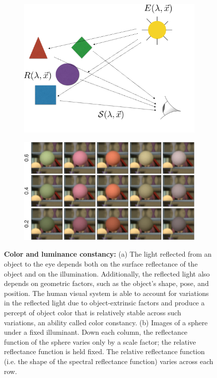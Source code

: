 \documentclass{jov}
\begin{document}
\begin{figure}
\centering
\begin{subfigure}{0.4 \textwidth}
	\centering
	\caption{}
        \includegraphics[width=\textwidth]{../FiguresDraft4/Figure1/Figure1_a.png}
        \label{fig:introSchematic}
    \end{subfigure}
    \begin{subfigure}{0.55 \textwidth}   
        \caption{}    
        \includegraphics[width=\textwidth]{../FiguresDraft4/Figure1/Figure1_b.png}
        \label{fig:introExampleFigure}
    \end{subfigure}
    \label{introFigure}
    \caption{{\bf Color and luminance constancy:} (a)  The light reflected from an object to the eye depends both on the surface reflectance of the object and on the illumination. Additionally, the reflected light also depends on geometric factors, such as the object's shape, pose, and position. The human visual system is able to account for variations in the reflected light due to object-extrinsic factors and produce a percept of object color that is relatively stable across such variations, an ability called color constancy. (b) Images of a sphere under a fixed illuminant.  Down each column, the reflectance function of the sphere varies only by a scale factor; the relative reflectance function is held fixed.  The relative reflectance function (i.e. the shape of the spectral reflectance function) varies across each row.
}
\end{figure}
\end{document}
